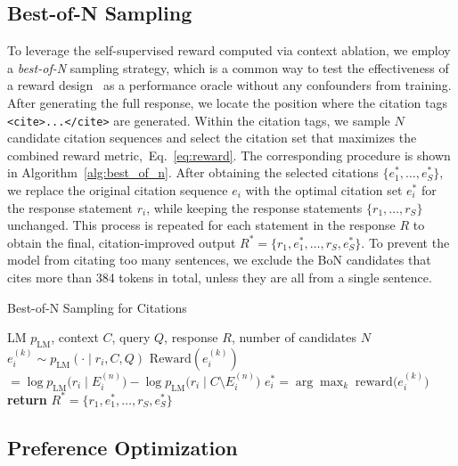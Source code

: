 \subsection{Best-of-N Sampling}
\label{sec:best_of_n_sampling}

To leverage the self-supervised reward computed via context ablation, we employ a \emph{best-of-N} sampling strategy, which is a common way to test the effectiveness of a reward design~\citep{gao2023scaling,lightman2024lets} as a performance oracle without any confounders from training. After generating the full response, we locate the position where the citation tags \texttt{<cite>...</cite>} are generated. Within the citation tags, we sample $N$ candidate citation sequences and select the citation set that maximizes the combined reward metric,~Eq.~\eqref{eq:reward}. The corresponding procedure is shown in Algorithm~\ref{alg:best_of_n}. After obtaining the selected citations $\{e_1^*, \dots, e_{S}^*\}$, we replace the original citation sequence $e_i$ with the optimal citation set $e_i^*$ for the response statement $r_i$, while keeping the response statements $\{r_1, \dots, r_{S}\}$ unchanged. This process is repeated for each statement in the response $R$ to obtain the final, citation-improved output $R^* = \{r_1, e_1^*, \dots, r_{S}, e_{S}^*\}$. To prevent the model from citating too many sentences, we exclude the BoN candidates that cites more than 384 tokens in total, unless they are all from a single sentence.
\begin{algorithm}[t!]
\caption{\ours Best-of-N Sampling for Citations}
\label{alg:best_of_n}
\begin{algorithmic}
\REQUIRE LM $p_{\text{LM}}$, context $C$, query $Q$, response $R$, number of candidates $N$
    \STATE $e_i^{(k)} \sim p_{\text{LM}}(\cdot \mid r_i, C, Q)$
    \STATE $\mathrm{Reward}(e_i^{(k)})$
        $ = \log p_{\text{LM}}\bigl(r_i \mid E_i^{(n)}\bigr) 
    - \log p_{\text{LM}}\bigl(r_i \mid C \setminus E_i^{(n)}\bigr)$
  \ENDFOR
  \STATE $e_i^* = \arg\max_{k}\;\mathrm{reward}\bigl(e_i^{(k)}\bigr)$
\ENDFOR
\STATE \textbf{return} $R^* = \{r_1, e_1^*, \dots, r_{S}, e_{S}^*\}$
\end{algorithmic}
\end{algorithm}

\subsection{Preference Optimization}
\label{sec:preference_optimization}

